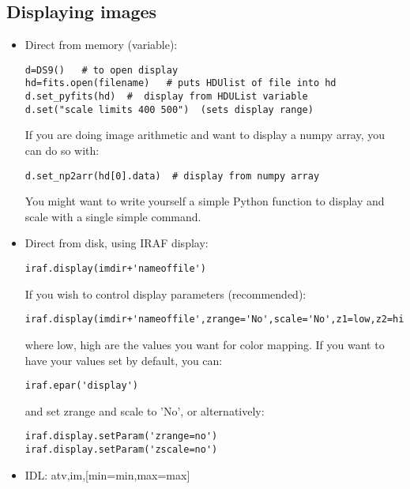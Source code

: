 \documentclass{article}
\begin{document}
\subsection*{Displaying images}
\begin{itemize}
\item Direct from memory (variable):
\begin{verbatim}
d=DS9()   # to open display
hd=fits.open(filename)   # puts HDUlist of file into hd
d.set_pyfits(hd)  #  display from HDUList variable
d.set("scale limits 400 500")  (sets display range)
\end{verbatim}
If you are doing image arithmetic and want to display a numpy array,
you can do so with:
\begin{verbatim}
d.set_np2arr(hd[0].data)  # display from numpy array
\end{verbatim}
You might want to write yourself a simple Python function to display
and scale with a single simple command.
\item Direct from disk, using IRAF display:
\begin{verbatim}
iraf.display(imdir+'nameoffile')
\end{verbatim}
If you wish to control display parameters (recommended):
\begin{verbatim}
iraf.display(imdir+'nameoffile',zrange='No',scale='No',z1=low,z2=high)
\end{verbatim}
where low, high are the values you want for color mapping. If you want
to have your values set by default, you can:
\begin{verbatim}
iraf.epar('display')
\end{verbatim}
and set zrange and scale to 'No', or alternatively:
\begin{verbatim}
iraf.display.setParam('zrange=no')
iraf.display.setParam('zscale=no')
\end{verbatim}
\item IDL: atv,im,[min=min,max=max]
\end{itemize}
\end{document}
